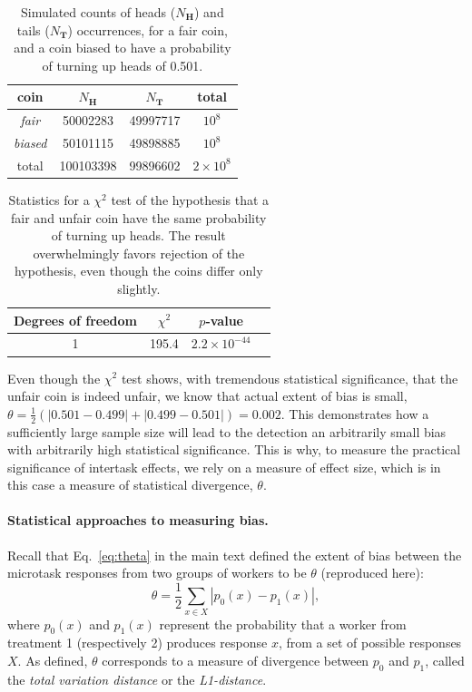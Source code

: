 \documentclass[12pt]{article}
\begin{document}
\setlength{\floatsep}{30pt plus 1.0pt minus 2.0pt}

\begin{table}
\centering
\begin{tabular}{c c c c}
\toprule
coin & $N_\mathbf{H}$ & $N_{\mathbf{T}}$ & total \\
\toprule
\textit{fair} & 50002283 & 49997717 & $10^8$\\
\textit{biased} & 50101115 & 49898885 & $10^8$ \\
\bottomrule
total & 100103398 & 99896602 & $2\times 10^8$ \\
\bottomrule
\end{tabular}
\caption{
	Simulated counts of heads ($N_\mathbf{H}$) and tails ($N_\mathbf{T}$)
	occurrences, for a fair coin, and a coin biased to have a probability
	of turning up heads of 0.501.
}
\label{table:coin}
\end{table}


\begin{table}
\centering
	\begin{tabular}{c c c c }
	\toprule
	Degrees of freedom & $\chi^2$ & $p$-value \\
	\toprule
	1 & 195.4 & $2.2 \times 10^{-44}$ \\
	\bottomrule
	\end{tabular}
\caption{
	Statistics for a $\chi^2$ test of the hypothesis that a fair and 
	unfair coin have the same probability of turning up heads.  
	The result overwhelmingly favors rejection of the hypothesis, even
	though the coins differ only slightly.
}
\label{table:coin_stats}
\end{table}

Even though the $\chi^2$ test shows, with tremendous statistical 
significance, that the unfair coin is indeed unfair, we know that actual 
extent of bias is small, 
$\theta = \frac{1}{2}\left( |0.501 - 0.499| + |0.499 - 0.501| \right) = 0.002$.
This demonstrates how a sufficiently large sample size will lead to the 
detection an arbitrarily 
small bias with arbitrarily high statistical significance. 
This is why, to measure the practical significance of intertask effects,
we rely on a measure of effect size, which is in this case a measure
of statistical divergence, $\theta$.

\paragraph{Statistical approaches to measuring bias.}
Recall that Eq.~\ref{eq:theta} in the main text defined the
extent of bias between the microtask responses from two groups
of workers to be $\theta$ (reproduced here):
\begin{equation}
	\theta = \frac{1}{2}\sum_{x \in X} \left| p_0(x) - p_1(x) \right|,
\end{equation}
where $p_0(x)$ and $p_1(x)$ represent the probability that a worker from
treatment 1 (respectively 2) produces response $x$, from a set of possible
responses $X$.  As defined, $\theta$ corresponds to a measure of divergence 
between $p_0$ and $p_1$, called the \textit{total variation distance} or the
\textit{L1-distance}.
\end{document}
